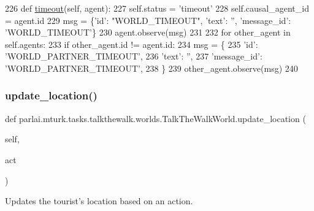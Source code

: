 \begin{DoxyCode}
226     \textcolor{keyword}{def }\hyperlink{namespaceparlai_1_1utils_1_1testing_aa8539ab1d17813b0c17f08700b2c2c2e}{timeout}(self, agent):
227         self.status = \textcolor{stringliteral}{'timeout'}
228         self.causal\_agent\_id = agent.id
229         msg = \{\textcolor{stringliteral}{'id'}: \textcolor{stringliteral}{"WORLD\_TIMEOUT"}, \textcolor{stringliteral}{'text'}: \textcolor{stringliteral}{''}, \textcolor{stringliteral}{'message\_id'}: \textcolor{stringliteral}{'WORLD\_TIMEOUT'}\}
230         agent.observe(msg)
231 
232         \textcolor{keywordflow}{for} other\_agent \textcolor{keywordflow}{in} self.agents:
233             \textcolor{keywordflow}{if} other\_agent.id != agent.id:
234                 msg = \{
235                     \textcolor{stringliteral}{'id'}: \textcolor{stringliteral}{'WORLD\_PARTNER\_TIMEOUT'},
236                     \textcolor{stringliteral}{'text'}: \textcolor{stringliteral}{''},
237                     \textcolor{stringliteral}{'message\_id'}: \textcolor{stringliteral}{'WORLD\_PARTNER\_TIMEOUT'},
238                 \}
239                 other\_agent.observe(msg)
240 
\end{DoxyCode}
\mbox{\label{classparlai_1_1mturk_1_1tasks_1_1talkthewalk_1_1worlds_1_1TalkTheWalkWorld_a30adb3fe817fef8f40a6a2f61773972d}} 
\subsubsection{\texorpdfstring{update\+\_\+location()}{update\_location()}}
{\footnotesize\ttfamily def parlai.\+mturk.\+tasks.\+talkthewalk.\+worlds.\+Talk\+The\+Walk\+World.\+update\+\_\+location (\begin{DoxyParamCaption}\item[{}]{self,  }\item[{}]{act }\end{DoxyParamCaption})}

\begin{DoxyVerb}Updates the tourist's location based on an action.
\end{DoxyVerb}
 

